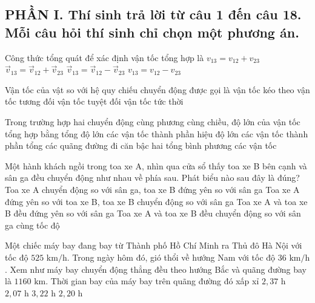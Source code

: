 \subsection*{PHẦN I. Thí sinh trả lời từ câu 1 đến câu 18. Mỗi câu hỏi thí sinh chỉ chọn một phương án.}

\begin{ex}
Công thức tổng quát để xác định vận tốc tổng hợp là
\choice
{$v_{13} = v_{12} + v_{23}$}
{\True $\vec{v}_{13} = \vec{v}_{12} + \vec{v}_{23}$}
{$\vec{v}_{13} = \vec{v}_{12} - \vec{v}_{23}$}
{$v_{13} = v_{12} - v_{23}$}
\end{ex}

\begin{ex}
Vận tốc của vật so với hệ quy chiếu chuyển động được gọi là
\choice
{vận tốc kéo theo}
{\True vận tốc tương đối}
{vận tốc tuyệt đối}
{vận tốc tức thời}
\end{ex}

\begin{ex}
Trong trường hợp hai chuyển động cùng phương cùng chiều, độ lớn của vận tốc tổng hợp bằng
\choice
{\True tổng độ lớn các vận tốc thành phần}
{hiệu độ lớn các vận tốc thành phần}
{tổng các quãng đường đi}
{căn bậc hai tổng bình phương các vận tốc}
\end{ex}

\begin{ex}
Một hành khách ngồi trong toa xe A, nhìn qua cửa sổ thấy toa xe B bên cạnh và sân ga đều chuyển động như nhau về phía sau. Phát biểu nào sau đây là đúng?
\choice
{\True Toa xe A chuyển động so với sân ga, toa xe B đứng yên so với sân ga}
{Toa xe A đứng yên so với toa xe B, toa xe B chuyển động so với sân ga}
{Toa xe A và toa xe B đều đứng yên so với sân ga}
{Toa xe A và toa xe B đều chuyển động so với sân ga cùng tốc độ}
\end{ex}

\begin{ex}
Một chiếc máy bay đang bay từ Thành phố Hồ Chí Minh ra Thủ đô Hà Nội với tốc độ $525\text{ km/h}$. Trong ngày hôm đó, gió thổi về hướng Nam với tốc độ $36\text{ km/h}$. Xem như máy bay chuyển động thẳng đều theo hướng Bắc và quãng đường bay là $1160\text{ km}$. Thời gian bay của máy bay trên quãng đường đó xấp xỉ
\choice
{\True $2{,}37\text{ h}$}
{$2{,}07\text{ h}$}
{$3{,}22\text{ h}$}
{$2{,}20\text{ h}$}
\end{ex}

